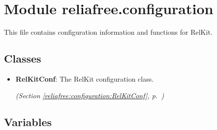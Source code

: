 %
%
%


\section{Module reliafree.configuration}

    \label{reliafree:configuration}
This file contains configuration information and functions for RelKit.



\subsection{Classes}

\begin{itemize}  \setlength{\parskip}{0ex}
  \item \textbf{RelKitConf}: The RelKit configuration class.



  \textit{(Section \ref{reliafree:configuration:RelKitConf}, p.~\pageref{reliafree:configuration:RelKitConf})}

\end{itemize}


  \subsection{Variables}


